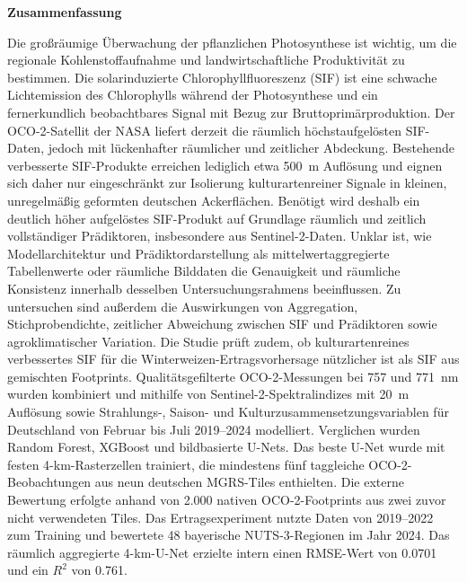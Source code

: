 \thispagestyle{empty}
\vspace*{0.2cm}

\begin{center}
    \textbf{Zusammenfassung}
\end{center}

\vspace*{0.2cm}

\noindent 

\noindent
Die großräumige Überwachung der pflanzlichen Photosynthese ist wichtig, um die regionale Kohlenstoffaufnahme und landwirtschaftliche Produktivität zu bestimmen.
Die solarinduzierte Chlorophyllfluoreszenz (SIF) ist eine schwache Lichtemission des Chlorophylls während der Photosynthese und ein fernerkundlich beobachtbares Signal mit Bezug zur Bruttoprimärproduktion.
Der OCO-2-Satellit der NASA liefert derzeit die räumlich höchstaufgelösten SIF-Daten, jedoch mit lückenhafter räumlicher und zeitlicher Abdeckung.
Bestehende verbesserte SIF-Produkte erreichen lediglich etwa 500~m Auflösung und eignen sich daher nur eingeschränkt zur Isolierung kulturartenreiner Signale in kleinen, unregelmäßig geformten deutschen Ackerflächen.
Benötigt wird deshalb ein deutlich höher aufgelöstes SIF-Produkt auf Grundlage räumlich und zeitlich vollständiger Prädiktoren, insbesondere aus Sentinel-2-Daten.
Unklar ist, wie Modellarchitektur und Prädiktordarstellung als mittelwertaggregierte Tabellenwerte oder räumliche Bilddaten die Genauigkeit und räumliche Konsistenz innerhalb desselben Untersuchungsrahmens beeinflussen.
Zu untersuchen sind außerdem die Auswirkungen von Aggregation, Stichprobendichte, zeitlicher Abweichung zwischen SIF und Prädiktoren sowie agroklimatischer Variation.
Die Studie prüft zudem, ob kulturartenreines verbessertes SIF für die Winterweizen-Ertragsvorhersage nützlicher ist als SIF aus gemischten Footprints. Qualitätsgefilterte OCO-2-Messungen bei 757 und 771~nm wurden kombiniert und mithilfe von Sentinel-2-Spektralindizes mit 20~m Auflösung sowie Strahlungs-, Saison- und Kulturzusammensetzungsvariablen für Deutschland von Februar bis Juli 2019--2024 modelliert.
Verglichen wurden Random Forest, XGBoost und bildbasierte U-Nets.
Das beste U-Net wurde mit festen 4-km-Rasterzellen trainiert, die mindestens fünf taggleiche OCO-2-Beobachtungen aus neun deutschen MGRS-Tiles enthielten. Die externe Bewertung erfolgte anhand von 2.000 nativen OCO-2-Footprints aus zwei zuvor nicht verwendeten Tiles. Das Ertragsexperiment nutzte Daten von 2019--2022 zum Training und bewertete 48 bayerische NUTS-3-Regionen im Jahr 2024. Das räumlich aggregierte 4-km-U-Net erzielte intern einen RMSE-Wert von 0.0701 und ein $R^2$ von 0.761.
